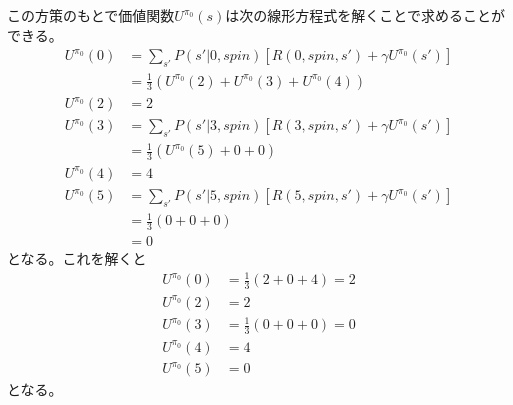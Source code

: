 \documentclass[a4paper,11pt,dvipdfmx]{jsarticle}
\begin{document}
この方策のもとで価値関数\(U^{\pi_0}(s)\)は次の線形方程式を解くことで求めることができる。
\begin{align*}
    U^{\pi_0}(0) &= \sum_{s'}P(s'|0,spin)[R(0,spin,s')+\gamma U^{\pi_0}(s')] \\
                 &= \frac{1}{3}(U^{\pi_0}(2)+U^{\pi_0}(3)+U^{\pi_0}(4)) \\
    U^{\pi_0}(2) &= 2 \\
    U^{\pi_0}(3) &= \sum_{s'}P(s'|3,spin)[R(3,spin,s')+\gamma U^{\pi_0}(s')] \\
                 &= \frac{1}{3}(U^{\pi_0}(5)+0+0) \\
    U^{\pi_0}(4) &= 4 \\
    U^{\pi_0}(5) &= \sum_{s'}P(s'|5,spin)[R(5,spin,s')+\gamma U^{\pi_0}(s')] \\
                 &= \frac{1}{3}(0+0+0) \\
                 &= 0
\end{align*}
となる。これを解くと
\begin{align*}
    U^{\pi_0}(0) &= \frac{1}{3}(2+0+4) = 2 \\
    U^{\pi_0}(2) &= 2 \\
    U^{\pi_0}(3) &= \frac{1}{3}(0+0+0) = 0 \\
    U^{\pi_0}(4) &= 4 \\
    U^{\pi_0}(5) &= 0
\end{align*}
となる。
\end{document}
